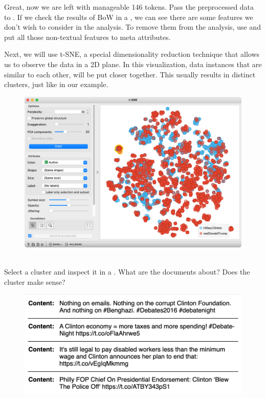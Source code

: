 Great, now we are left with manageable 146 tokens. Pass the preprocessed data to . If we check the results of BoW in a , we can see there are some features we don't wish to consider in the analysis. To remove them from the analysis, use  and put all those non-textual features to meta attributes.

Next, we will use t-SNE, a special dimensionality reduction technique that allows us to observe the data in a 2D plane. In this visualization, data instances that are similar to each other, will be put closer together. This usually results in distinct clusters, just like in our example.

\vspace{-0.2cm}
\begin{figure}[h]
  \centering
  \includegraphics[width=0.8\linewidth]{t-sne.png}%
  \caption{$\;$}
\end{figure}
\vspace{-0.3cm}

Select a cluster and inspect it in a . What are the documents about? Does the cluster make sense?

\vspace{-0.2cm}
\begin{figure}[h]
  \centering
  \includegraphics[width=\linewidth]{corpus-viewer.png}%
  \caption{$\;$}
\end{figure}
\vspace{-0.3cm}
